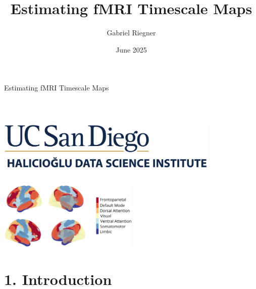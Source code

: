 \documentclass[8pt,aspectratio=169]{beamer}
\title{Estimating fMRI Timescale Maps}
\author[]{Gabriel Riegner}
\date{June 2025}
\begin{document}
\begin{frame}{\centerline{\Large Estimating fMRI Timescale Maps}}
\\
\vfill

\begin{columns}
\tableofcontents[hideallsubsections]
\includegraphics[width=0.8\textwidth]{docs/wnar/hdsi.png}
\end{columns}

\vfill
\includegraphics[width=0.5\textwidth]{docs/wnar/toc.pdf}
\end{frame}

\section{1. Introduction}
\end{document}
